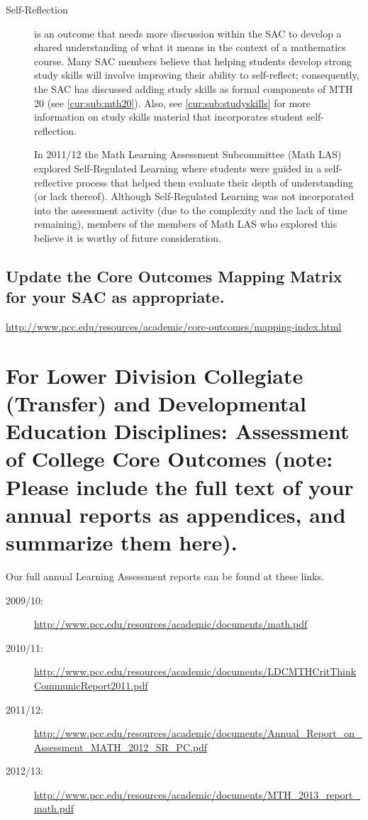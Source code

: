 \begin{description}
\item[Self-Reflection] is an outcome that needs more discussion within the SAC to develop a shared understanding of what it means in the context of a mathematics course.  Many SAC members believe that helping students develop strong study skills will involve improving their ability to self-reflect; consequently, the SAC has discussed adding study skills as formal components of MTH 20 (see \vref{cur:sub:mth20}).  Also,  see \vref{cur:sub:studyskills} for more information on study skills material that incorporates student self-reflection. 

In 2011/12 the Math Learning Assessment Subcommittee (Math LAS) explored Self-Regulated Learning where students were guided in a self-reflective process that helped them evaluate their depth of understanding (or lack thereof).  Although Self-Regulated Learning was not incorporated into the assessment activity (due to the complexity and the lack of time remaining), members of the members of Math LAS who explored this believe it is worthy of future consideration.

\end{description}

\subsection{Update the Core Outcomes Mapping Matrix for your SAC as appropriate.}\url{http://www.pcc.edu/resources/academic/core-outcomes/mapping-index.html} 




\section[Assessment of College Core Outcomes]{For Lower Division Collegiate (Transfer) and Developmental Education Disciplines:  Assessment of College Core Outcomes    (note:  Please include the full text of your annual reports as appendices, and summarize them here).  }

Our full annual Learning Assessment reports can be found at these links. 

\begin{description}
\item[2009/10:] \url{http://www.pcc.edu/resources/academic/documents/math.pdf}
\item[2010/11:] \url{http://www.pcc.edu/resources/academic/documents/LDCMTHCritThinkCommunicReport2011.pdf}
\item[2011/12:] \url{http://www.pcc.edu/resources/academic/documents/Annual_Report_on_Assessment_MATH_2012_SR_PC.pdf}
\item[2012/13:] \url{http://www.pcc.edu/resources/academic/documents/MTH_2013_report_math.pdf}
\end{description}

